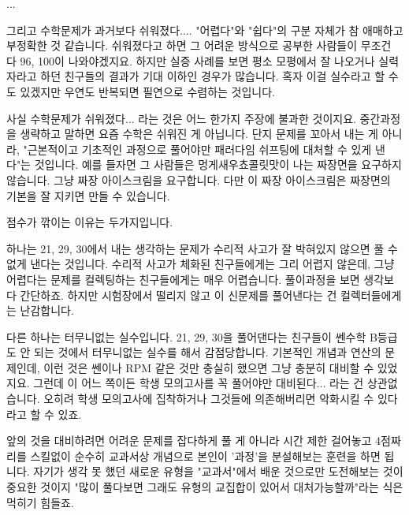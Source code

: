 ...
\vspace{5mm}

그리고 수학문제가 과거보다 쉬워졌다....
"어렵다"와 "쉽다"의 구분 자체가 참 애매하고 부정확한 것 같습니다.
쉬워졌다고 하면 그 어려운 방식으로 공부한 사람들이 무조건 다 96, 100이 나와야겠지요.
하지만 실증 사례를 보면 평소 모평에서 잘 나오거나 실력자라고 하던 친구들의 결과가 기대 이하인 경우가 많습니다.
혹자 이걸 실수라고 할 수도 있겠지만 우연도 반복되면 필연으로 수렴하는 것입니다.
\vspace{5mm}

사실 수학문제가 쉬워졌다... 라는 것은 어느 한가지 주장에 불과한 것이지요.
중간과정을 생략하고 말하면 요즘 수학은 쉬워진 게 아닙니다.
단지 문제를 꼬아서 내는 게 아니라, "근본적이고 기초적인 과정으로 풀어야만 패러다임 쉬프팅에 대처할 수 있게 낸다"는 것입니다.
예를 들자면 그 사람들은 멍게새우쵸콜릿맛이 나는 짜장면을 요구하지 않습니다.
그냥 짜장 아이스크림을 요구합니다. 다만 이 짜장 아이스크림은 짜장면의 기본을 잘 지키면 만들 수 있습니다.
\vspace{5mm}

점수가 깎이는 이유는 두가지입니다.
\vspace{5mm}

하나는 21, 29, 30에서 내는 생각하는 문제가 수리적 사고가 잘 박혀있지 않으면 풀 수 없게 낸다는 것입니다.
수리적 사고가 체화된 친구들에게는 그리 어렵지 않은데, 그냥 어렵다는 문제를 컬렉팅하는 친구들에게는 매우 어렵습니다.
풀이과정을 보면 생각보다 간단하죠. 하지만 시험장에서 떨리지 않고 이 신문제를 풀어낸다는 건 컬렉터들에게는 난감합니다.
\vspace{5mm}

다른 하나는 터무니없는 실수입니다.
21, 29, 30을 풀어댄다는 친구들이 쎈수학 B등급도 안 되는 것에서 터무니없는 실수를 해서 감점당합니다.
기본적인 개념과 연산의 문제인데, 이런 것은 쎈이나 RPM 같은 것만 충실히 했으면 그냥 충분히 대비할 수 있었지요.
그런데 이 어느 쪽이든 학생 모의고사를 꼭 풀어야만 대비된다... 라는 건 상관없습니다.
오히려 학생 모의고사에 집착하거나 그것들에 의존해버리면 악화시킬 수 있다라고 할 수 있죠.
\vspace{5mm}

앞의 것을 대비하려면 어려운 문제를 잡다하게 풀 게 아니라
시간 제한 걸어놓고 4점짜리를 스킬없이 순수히 교과서상 개념으로 본인이 '과정'을 분설해보는 훈련을 하면 됩니다.
자기가 생각 못 했던 새로운 유형을 "교과서"에서 배운 것으로만 도전해보는 것이 중요한 것이지
"많이 풀다보면 그래도 유형의 교집합이 있어서 대처가능할까"라는 식은 먹히기 힘들죠.
\vspace{5mm}

